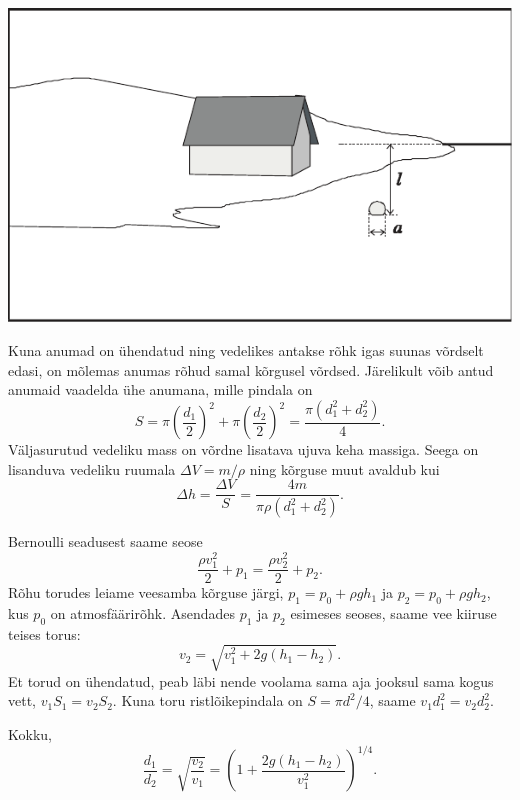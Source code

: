 \documentclass[10pt, twoside]{article}
\begin{document}
{\begin{center}
	\includegraphics[width=0.9\linewidth]{2008-lahg-09-lah}
\end{center}
\probend
\bigskip


\solu
Kuna anumad on ühendatud ning vedelikes antakse rõhk igas suunas võrdselt edasi, on mõlemas anumas rõhud samal kõrgusel võrdsed. Järelikult võib antud anumaid vaadelda ühe anumana, mille pindala on
\[
S=\pi\left(\frac{d_{1}}{2}\right)^{2}+\pi\left(\frac{d_{2}}{2}\right)^{2}=\frac{\pi\left(d_{1}^{2}+d_{2}^{2}\right)}{4}.
\]
Väljasurutud vedeliku mass on võrdne lisatava ujuva keha massiga. Seega on lisanduva vedeliku ruumala $\Delta V = m/\rho$ ning kõrguse muut avaldub kui
\[
\Delta h=\frac{\Delta V}{S}=\frac{4 m}{\pi \rho\left(d_{1}^{2}+d_{2}^{2}\right)}.
\]
\probend
\bigskip


\solu
Bernoulli seadusest saame seose 
\[
\frac{\rho v_1^2}{2}+p_1=\frac{\rho v_2^2}{2}+p_2.
\]
Rõhu torudes leiame veesamba kõrguse järgi, $p_1=p_0 + \rho g h_1$ ja $p_2=p_0 + \rho g h_2$, kus $p_0$ on atmosfäärirõhk.
Asendades $p_1$ ja $p_2$ esimeses seoses, saame vee kiiruse teises torus:
\[
v_2=\sqrt{v_1^2+2g(h_1-h_2)}.
\]
Et torud on ühendatud, peab läbi nende voolama sama aja jooksul sama kogus vett, $v_1 S_1 = v_2 S_2$.
Kuna toru ristlõikepindala on $S=\pi d^2 / 4$, saame $v_1 d_1^2 = v_2 d_2^2$.

Kokku,
\[
\frac{d_1}{d_2}=\sqrt{\frac{v_2}{v_1}}=\left(1+\frac{2g(h_1-h_2)}{v_1^2}\right)^{1/4}.
\]
\probend
\bigskip

}
\end{document}
